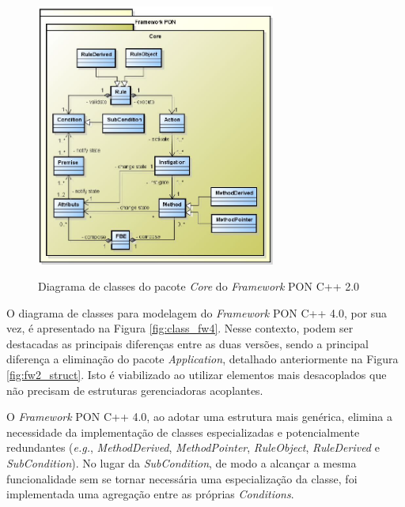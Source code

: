 \begin{figure}[!htb]
    \centering
    \caption{Diagrama de classes do pacote \textit{Core} do \textit{Framework}
        PON C++ 2.0} \includegraphics[width=0.7\textwidth]{../figures/fw2_core.PNG}
    \smallskip
    \label{fig:class_fw2_core}
\end{figure}



O diagrama de classes para modelagem do \textit{Framework} PON C++ 4.0, por sua
vez, é apresentado na Figura \ref{fig:class_fw4}. Nesse contexto, podem
ser destacadas as principais diferenças entre as duas versões, sendo a principal
diferença a eliminação do pacote \textit{Application}, detalhado anteriormente
na Figura \ref{fig:fw2_struct}. Isto é viabilizado ao utilizar elementos
mais desacoplados que não precisam de estruturas gerenciadoras acoplantes.

O \textit{Framework} PON C++ 4.0, ao adotar uma estrutura mais genérica, elimina
a necessidade da implementação de classes especializadas e potencialmente
redundantes (\textit{e.g.}, \textit{MethodDerived}, \textit{MethodPointer},
\textit{RuleObject}, \textit{RuleDerived} e \textit{SubCondition}). No lugar da
\textit{SubCondition}, de modo a alcançar a mesma funcionalidade sem se tornar
necessária uma especialização da classe, foi implementada uma agregação entre as
próprias \textit{Conditions}.

